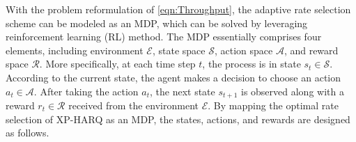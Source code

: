 \documentclass[lettersize,journal]{IEEEtran}
\begin{document}

With the problem reformulation of \eqref{eqn:Throughput}, the adaptive rate selection scheme can be modeled as an MDP, which can be solved by leveraging reinforcement learning (RL) method. The MDP essentially comprises four elements, including environment $\mathcal E$, state space $\mathcal S$, action space $\mathcal A$, and reward space $\mathcal R$. More specifically, at each time step $t$, the process is in state $s_t\in \mathcal S$. According to the current state, the agent makes a decision to choose an action $a_t \in \mathcal A$. After taking the action $a_t$, the next state $s_{t+1}$ is observed along with a reward $r_{t}\in \mathcal R$ received from the environment $\mathcal E$. By mapping the optimal rate selection of XP-HARQ as an MDP, the states, actions, and rewards are designed as follows.
\end{document}
